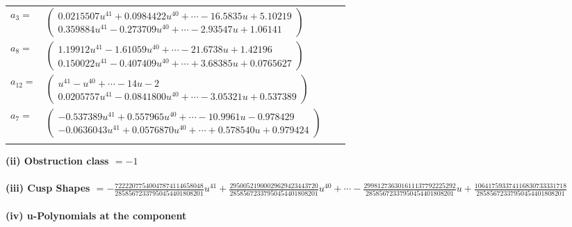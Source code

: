 \documentclass[1p]{elsarticle_modified}
\theoremstyle{definition}
\begin{document}
\begin{tabular}{m{7pt} m{180pt} m{7pt} m{180pt} }
\flushright $a_{3}=$&$\begin{pmatrix}0.0215507 u^{41}+0.0984422 u^{40}+\cdots-16.5835 u+5.10219\\0.359884 u^{41}-0.273709 u^{40}+\cdots-2.93547 u+1.06141\end{pmatrix}$ \\
\flushright $a_{8}=$&$\begin{pmatrix}1.19912 u^{41}-1.61059 u^{40}+\cdots-21.6738 u+1.42196\\0.150022 u^{41}-0.407409 u^{40}+\cdots+3.68385 u+0.0765627\end{pmatrix}$ \\
\flushright $a_{12}=$&$\begin{pmatrix}u^{41}- u^{40}+\cdots-14 u-2\\0.0205757 u^{41}-0.0841800 u^{40}+\cdots-3.05321 u+0.537389\end{pmatrix}$ \\
\flushright $a_{7}=$&$\begin{pmatrix}-0.537389 u^{41}+0.557965 u^{40}+\cdots-10.9961 u-0.978429\\-0.0636043 u^{41}+0.0576870 u^{40}+\cdots+0.578540 u+0.979424\end{pmatrix}$\\&\end{tabular}
\flushleft \textbf{(ii) Obstruction class $= -1$}\\~\\
\flushleft \textbf{(iii) Cusp Shapes $= -\frac{72222077540047874114658048}{28585672337950454401808201} u^{41}+\frac{29500521900029629423443720}{28585672337950454401808201} u^{40}+\cdots-\frac{299812736301611137792225292}{28585672337950454401808201} u+\frac{106417593374116830733331718}{28585672337950454401808201}$}\\~\\
\newpage\renewcommand{\arraystretch}{1}
\flushleft \textbf{(iv) u-Polynomials at the component}\newline \\
\end{document}
